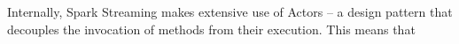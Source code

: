 
Internally, Spark Streaming makes extensive use of Actors -- a design pattern that decouples the invocation of methods from their execution. This means that 